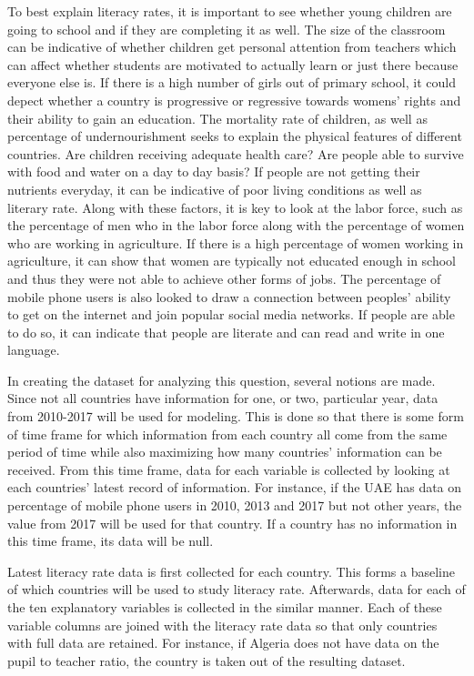 \documentclass[]{article}
\begin{document}
To best explain literacy rates, it is important to see whether young
children are going to school and if they are completing it as well. The
size of the classroom can be indicative of whether children get personal
attention from teachers which can affect whether students are motivated
to actually learn or just there because everyone else is. If there is a
high number of girls out of primary school, it could depect whether a
country is progressive or regressive towards womens' rights and their
ability to gain an education. The mortality rate of children, as well as
percentage of undernourishment seeks to explain the physical features of
different countries. Are children receiving adequate health care? Are
people able to survive with food and water on a day to day basis? If
people are not getting their nutrients everyday, it can be indicative of
poor living conditions as well as literary rate. Along with these
factors, it is key to look at the labor force, such as the percentage of
men who in the labor force along with the percentage of women who are
working in agriculture. If there is a high percentage of women working
in agriculture, it can show that women are typically not educated enough
in school and thus they were not able to achieve other forms of jobs.
The percentage of mobile phone users is also looked to draw a connection
between peoples' ability to get on the internet and join popular social
media networks. If people are able to do so, it can indicate that people
are literate and can read and write in one language.

In creating the dataset for analyzing this question, several notions are
made. Since not all countries have information for one, or two,
particular year, data from 2010-2017 will be used for modeling. This is
done so that there is some form of time frame for which information from
each country all come from the same period of time while also maximizing
how many countries' information can be received. From this time frame,
data for each variable is collected by looking at each countries' latest
record of information. For instance, if the UAE has data on percentage
of mobile phone users in 2010, 2013 and 2017 but not other years, the
value from 2017 will be used for that country. If a country has no
information in this time frame, its data will be null.

Latest literacy rate data is first collected for each country. This
forms a baseline of which countries will be used to study literacy rate.
Afterwards, data for each of the ten explanatory variables is collected
in the similar manner. Each of these variable columns are joined with
the literacy rate data so that only countries with full data are
retained. For instance, if Algeria does not have data on the pupil to
teacher ratio, the country is taken out of the resulting dataset.
\end{document}
